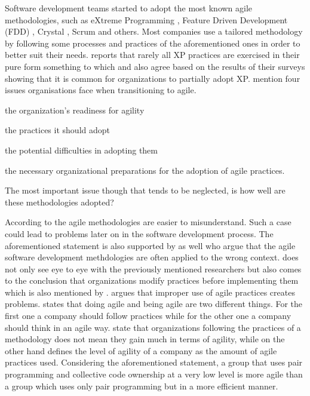 Software development teams started to adopt the most known agile methodologies, such as eXtreme Programming \cite{Beck:2004:EPE:1076267}, Feature Driven Development (FDD) \cite{Palmer:2001:PGF:600044}, Crystal \cite{Cockburn:2004:CCH:1406822}, Scrum \cite{scrum} and others. Most companies use a tailored methodology by following some processes and practices of the aforementioned ones in order to better suit their needs. \citet{williams2004toward} reports that rarely all XP practices are exercised in their pure form something to which \citet{Reifer} and \citet{aveling} also agree based on the results of their surveys showing that it is common for organizations to partially adopt XP. \citet{sidky} mention four issues organisations face when transitioning to agile.
\begin{inparaenum} [a\upshape)]
\item the organization's readiness for agility
\item the practices it should adopt
\item the potential difficulties in adopting them
\item the necessary organizational preparations for the adoption of agile practices. 
\end{inparaenum}
The most important issue though that tends to be neglected, is how well are these methodologies adopted? 

According to \citet{6427226} the agile methodologies are easier to misunderstand. Such a case could lead to problems later on in the software development process. The aforementioned statement is also supported by \citet{cefam} as well who argue that the agile software development methdologies are often applied to the wrong context. \citet{1629340} does not only see eye to eye with the previously mentioned researchers but also comes to the conclusion that organizations modify practices before implementing them which is also mentioned by \citet{1579312}. \citet{hossain} argues that improper use of agile practices creates problems. \citet{sahota} states that doing agile and being agile are two different things. For the first one a company should follow practices while for the other one a company should think in an agile way. \citet{lappoA04} state that organizations following the practices of a methodology does not mean they gain much in terms of agility, while on the other hand \citet{sidky_dissertation} defines the level of agility of a company as the amount of agile practices used. Considering the aforementioned statement, a group that uses pair programming and collective code ownership at a very low level is more agile than a group which uses only pair programming but in a more efficient manner.

